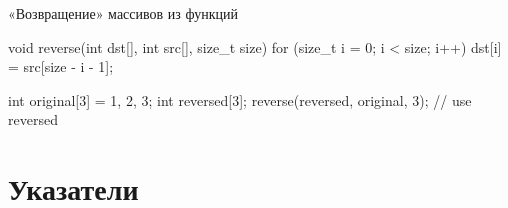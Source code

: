 \begin{frame}[fragile]{«Возвращение» массивов из функций}

  \begin{clisting}
    void reverse(int dst[], int src[], size_t size) {
        for (size_t i = 0; i < size; i++) {
            dst[i] = src[size - i - 1];
        }
    }

    int original[3] = {1, 2, 3};
    int reversed[3];
    reverse(reversed, original, 3);
    // use reversed
  \end{clisting}


\end{frame}


\section{Указатели}


\newcommand\memtop{1}
\newcommand\membottom{0}

\newcommand{\memline}[2]{
  \def\left{#1-0.45}
  \def\right{#2+0.45}

  \draw[byte lines] (\left,\membottom) grid (\right,\memtop);

  \foreach \y in {\membottom, \memtop}
    \draw (\left,\y) -- (\right,\y);

  \foreach \x in {\left, \right}
    \draw [decorate,decoration={snake,amplitude=0.3mm,segment length=3mm}]
      (\x,\membottom) -- (\x,\memtop);
}

\newcommand{\memblock}[3]{
  \def\left{#1}
  \def\right{#2}
  \def\blockname{#3}

  \draw [mem block,draw=none] (\left,\membottom) rectangle (\right,\memtop);
  \draw [block byte lines] (\left,\membottom) grid (\right,\memtop);
  \draw [mem block,fill=none] (\left,\membottom) rectangle (\right,\memtop)
    node [pos=0.5] (block \blockname) {};
}

\newcommand{\memaddr}[2]{
  \def\x{#1+0.5}
  \def\y{\membottom-0.5}
  \draw [-latex,shorten <=6pt] (\x,\y)
    node [fill=white,inner sep=0,outer sep=0] {\ttfamily\small #2} -- (\x,\membottom);
}

\newcommand{\memlabel}[3]{
  \path (#1,\memtop) -- (#2,\memtop)
    node [midway,yshift=3mm,text height=1.5ex] {\ttfamily #3};
}

